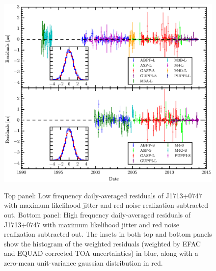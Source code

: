 \documentclass[12pt,preprint]{aastex}
\begin{document}
\begin{figure}
\includegraphics[scale=1.0]{1713_detres_inset.eps} \\ 
\caption{\label{fig:detres} Top panel: Low frequency daily-averaged residuals of J1713+0747 with maximum likelihood
jitter and red noise realization subtracted out. Bottom panel: High frequency daily-averaged residuals of J1713+0747 with maximum likelihood jitter and red noise realization subtracted out. The insets in both top and bottom panels show the histogram of the weighted residuals (weighted by EFAC and EQUAD corrected TOA uncertainties) in blue, along with a zero-mean unit-variance gaussian distribution in red.}
\end{figure} 


\end{document}
